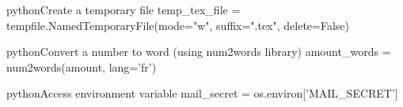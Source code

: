 \documentclass[10pt,a4paper]{article}
\begin{document}
\begin{multicols}{3}
\begin{codebox}{python}{Create a temporary file}
temp_tex_file = tempfile.NamedTemporaryFile(mode="w", suffix=".tex", delete=False)

\end{codebox}

\begin{codebox}{python}{Convert a number to word (using num2words library)}
amount_words = num2words(amount, lang='fr')

\end{codebox}

\begin{codebox}{python}{Access environment variable}
mail_secret = os.environ['MAIL_SECRET']

\end{codebox}


\AtNextBibliography{\footnotesize}
\printbibliography  
\end{multicols}
\end{document}
